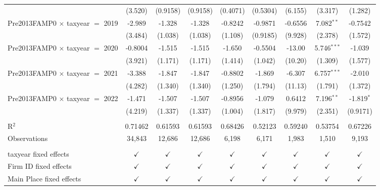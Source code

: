 \begin{tabular}{lcccccccc}
                                           & (3.520)       & (0.9158)      & (0.9158)      & (0.4071)       & (0.5304)        & (6.155)       & (3.317)       & (1.282)\\   
   Pre2013FAMP0 $\times$ taxyear $=$ 2019  & -2.989        & -1.328        & -1.328        & -0.8242        & -0.9871         & -0.6556       & 7.082$^{**}$  & -0.7542\\   
                                           & (3.484)       & (1.038)       & (1.038)       & (1.108)        & (0.9185)        & (9.928)       & (2.378)       & (1.572)\\   
   Pre2013FAMP0 $\times$ taxyear $=$ 2020  & -0.8004       & -1.515        & -1.515        & -1.650         & -0.5504         & -13.00        & 5.746$^{***}$ & -1.039\\   
                                           & (3.921)       & (1.171)       & (1.171)       & (1.414)        & (1.042)         & (10.20)       & (1.309)       & (1.577)\\   
   Pre2013FAMP0 $\times$ taxyear $=$ 2021  & -3.388        & -1.847        & -1.847        & -0.8802        & -1.869          & -6.307        & 6.757$^{***}$ & -2.010\\   
                                           & (4.282)       & (1.340)       & (1.340)       & (1.250)        & (1.794)         & (11.13)       & (1.791)       & (1.372)\\   
   Pre2013FAMP0 $\times$ taxyear $=$ 2022  & -1.471        & -1.507        & -1.507        & -0.8956        & -1.079          & 0.6412        & 7.196$^{**}$  & -1.819$^{*}$\\   
                                           & (4.219)       & (1.337)       & (1.337)       & (1.004)        & (1.817)         & (9.979)       & (2.351)       & (0.9171)\\   
    \\
   R$^2$                                   & 0.71462       & 0.61593       & 0.61593       & 0.68426        & 0.52123         & 0.59240       & 0.53754       & 0.67226\\  
   Observations                            & 34,843        & 12,686        & 12,686        & 6,198          & 6,171           & 1,983         & 1,510         & 9,193\\  
    \\
   taxyear fixed effects                   & $\checkmark$  & $\checkmark$  & $\checkmark$  & $\checkmark$   & $\checkmark$    & $\checkmark$  & $\checkmark$  & $\checkmark$\\   
   Firm ID fixed effects                   & $\checkmark$  & $\checkmark$  & $\checkmark$  & $\checkmark$   & $\checkmark$    & $\checkmark$  & $\checkmark$  & $\checkmark$\\   
   Main Place fixed effects                & $\checkmark$  & $\checkmark$  & $\checkmark$  & $\checkmark$   & $\checkmark$    & $\checkmark$  & $\checkmark$  & $\checkmark$\\   
   \bottomrule
\end{tabular}
\par\endgroup
